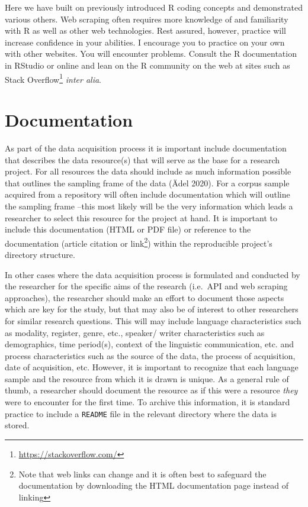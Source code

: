 \documentclass[
  letterpaper,
]{latex/krantz}
\DeclareRobustCommand{\href}[2]{#2\footnote{\url{#1}}}
\begin{document}
Here we have built on previously introduced R coding concepts and
demonstrated various others. Web scraping often requires more knowledge
of and familiarity with R as well as other web technologies. Rest
assured, however, practice will increase confidence in your abilities. I
encourage you to practice on your own with other websites. You will
encounter problems. Consult the R documentation in RStudio or online and
lean on the R community on the web at sites such as
\href{https://stackoverflow.com/}{Stack Overflow} \emph{inter alia}.

\hypertarget{documentation-1}{%
\section{Documentation}\label{documentation-1}}

As part of the data acquisition process it is important include
documentation that describes the data resource(s) that will serve as the
base for a research project. For all resources the data should include
as much information possible that outlines the sampling frame of the
data (Ädel 2020). For a corpus sample acquired from a repository will
often include documentation which will outline the sampling frame --this
most likely will be the very information which leads a researcher to
select this resource for the project at hand. It is important to include
this documentation (HTML or PDF file) or reference to the documentation
(article citation or link\footnote{Note that web links can change and it
  is often best to safeguard the documentation by downloading the HTML
  documentation page instead of linking}) within the reproducible
project's directory structure.

In other cases where the data acquisition process is formulated and
conducted by the researcher for the specific aims of the research
(i.e.~API and web scraping approaches), the researcher should make an
effort to document those aspects which are key for the study, but that
may also be of interest to other researchers for similar research
questions. This will may include language characteristics such as
modality, register, genre, etc., speaker/ writer characteristics such as
demographics, time period(s), context of the linguistic communication,
etc. and process characteristics such as the source of the data, the
process of acquisition, date of acquisition, etc. However, it is
important to recognize that each language sample and the resource from
which it is drawn is unique. As a general rule of thumb, a researcher
should document the resource as if this were a resource \emph{they} were
to encounter for the first time. To archive this information, it is
standard practice to include a \texttt{README} file in the relevant
directory where the data is stored.
\end{document}
